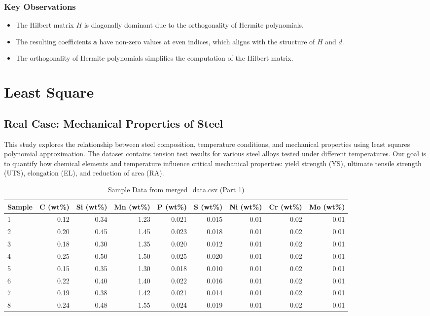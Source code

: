 \documentclass[10pt]{article}
\begin{document}
\subsubsection{Key Observations}
\begin{itemize}
    \item The Hilbert matrix \( H \) is diagonally dominant due to the orthogonality of Hermite polynomials.
    \item The resulting coefficients \( \mathbf{a} \) have non-zero values at even indices, which aligns with the structure of \( H \) and \( d \).
    \item The orthogonality of Hermite polynomials simplifies the computation of the Hilbert matrix.
\end{itemize}





\section{Least Square}
\subsection{Real Case: Mechanical Properties of Steel}
This study explores the relationship between steel composition, temperature conditions, and mechanical properties using least squares polynomial approximation. The dataset contains tension test results for various steel alloys tested under different temperatures. Our goal is to quantify how chemical elements and temperature influence critical mechanical properties: yield strength (YS), ultimate tensile strength (UTS), elongation (EL), and reduction of area (RA).

\begin{table}[htbp]
\centering
\caption{Sample Data from merged\_data.csv (Part 1)}
\label{tab:sample_data_part1}
\begin{tabular}{lrrrrrrrr}
\toprule
Sample & C (wt\%) & Si (wt\%) & Mn (wt\%) & P (wt\%) & S (wt\%) & Ni (wt\%) & Cr (wt\%) & Mo (wt\%) \\
\midrule
1 & 0.12 & 0.34 & 1.23 & 0.021 & 0.015 & 0.01 & 0.02 & 0.01 \\
2 & 0.20 & 0.45 & 1.45 & 0.023 & 0.018 & 0.01 & 0.02 & 0.01 \\
3 & 0.18 & 0.30 & 1.35 & 0.020 & 0.012 & 0.01 & 0.02 & 0.01 \\
4 & 0.25 & 0.50 & 1.50 & 0.025 & 0.020 & 0.01 & 0.02 & 0.01 \\
5 & 0.15 & 0.35 & 1.30 & 0.018 & 0.010 & 0.01 & 0.02 & 0.01 \\
6 & 0.22 & 0.40 & 1.40 & 0.022 & 0.016 & 0.01 & 0.02 & 0.01 \\
7 & 0.19 & 0.38 & 1.42 & 0.021 & 0.014 & 0.01 & 0.02 & 0.01 \\
8 & 0.24 & 0.48 & 1.55 & 0.024 & 0.019 & 0.01 & 0.02 & 0.01 \\
\bottomrule
\end{tabular}
\end{table}
\end{document}

